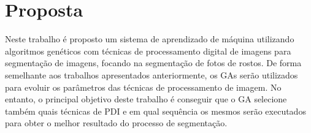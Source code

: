 \documentclass[12pt,oneside,a4paper,english,french,spanish,brazil,]{abntex2}
\begin{document}

\chapter{Proposta}

Neste trabalho é proposto um sistema de aprendizado de máquina utilizando algoritmos genéticos com técnicas de processamento digital de imagens para segmentação de imagens, focando na segmentação de fotos de rostos. De forma semelhante aos trabalhos apresentados anteriormente, os GAs serão utilizados para evoluir os parâmetros das técnicas de processamento de imagem. No entanto, o principal objetivo deste trabalho é conseguir que o GA selecione também quais técnicas de PDI e em qual sequência os mesmos serão executados para obter o melhor resultado do processo de segmentação.
\end{document}

